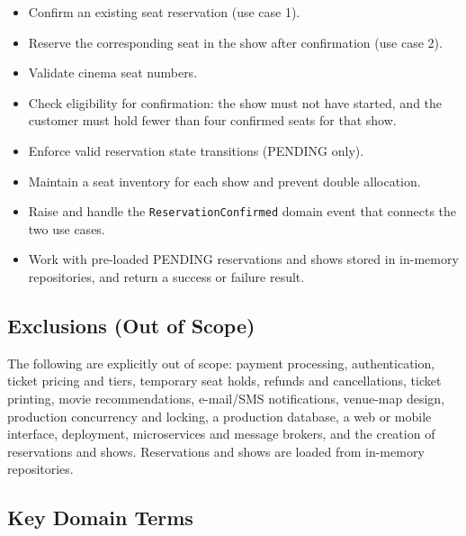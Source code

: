 \documentclass[11pt,a4paper]{article}
\newcommand{\code}[1]{\texttt{#1}}
\begin{document}
\begin{itemize}
  \item Confirm an existing seat reservation (use case 1).
  \item Reserve the corresponding seat in the show after confirmation (use
        case 2).
  \item Validate cinema seat numbers.
  \item Check eligibility for confirmation: the show must not have started, and
        the customer must hold fewer than four confirmed seats for that show.
  \item Enforce valid reservation state transitions (PENDING only).
  \item Maintain a seat inventory for each show and prevent double allocation.
  \item Raise and handle the \code{ReservationConfirmed} domain event that
        connects the two use cases.
  \item Work with pre-loaded PENDING reservations and shows stored in
        in-memory repositories, and return a success or failure result.
\end{itemize}

\subsection{Exclusions (Out of Scope)}

The following are explicitly out of scope: payment processing,
authentication, ticket pricing and tiers, temporary seat holds, refunds and
cancellations, ticket printing, movie recommendations, e-mail/SMS
notifications, venue-map design, production concurrency and locking, a
production database, a web or mobile interface, deployment, microservices and
message brokers, and the creation of reservations and shows. Reservations and
shows are loaded from in-memory repositories.

\subsection{Key Domain Terms}
\end{document}
